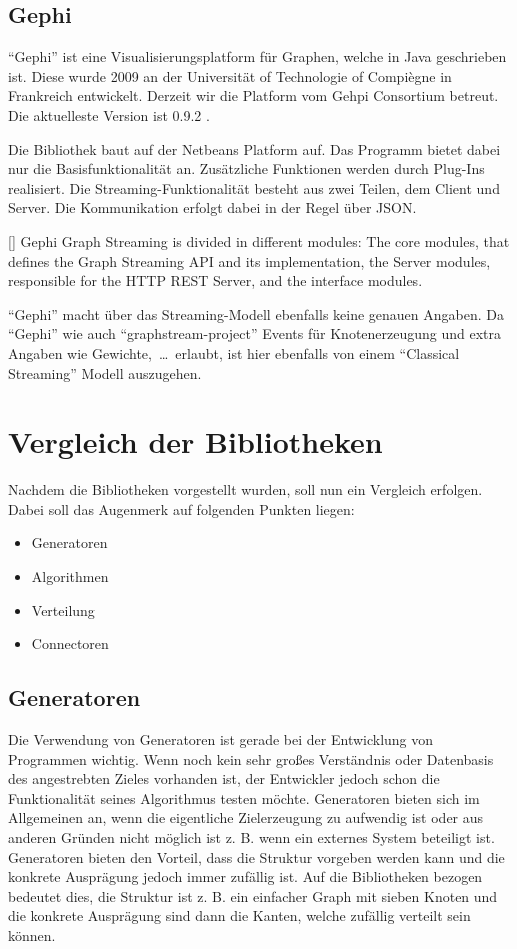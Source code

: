 \subsection{Gephi}
\enquote{Gephi} ist eine Visualisierungsplatform für Graphen, welche in Java
geschrieben ist. Diese wurde 2009 an der Universität of Technologie of Compiègne
in Frankreich entwickelt. Derzeit wir die Platform vom Gehpi Consortium betreut.
Die aktuelleste Version ist 0.9.2 .

Die Bibliothek baut auf der Netbeans Platform auf. Das Programm bietet dabei nur
die Basisfunktionalität an. Zusätzliche Funktionen werden durch Plug-Ins
realisiert. Die Streaming-Funktionalität besteht aus zwei Teilen, dem Client und
Server. Die Kommunikation erfolgt dabei in der Regel über \gls{JSON}.

[\cite{Bastian2009}]{
Gephi Graph Streaming is divided in different modules: The core modules, that
defines the Graph Streaming API and its implementation, the Server modules,
responsible for the HTTP REST Server, and the interface modules. 
}

\enquote{Gephi} macht über das Streaming-Modell ebenfalls keine genauen Angaben.
Da \enquote{Gephi} wie auch \enquote{graphstream-project} Events für
Knotenerzeugung und extra Angaben wie Gewichte,~\dots~erlaubt, ist hier
ebenfalls von einem \enquote{Classical Streaming} Modell auszugehen.

\section{Vergleich der Bibliotheken}
Nachdem die Bibliotheken vorgestellt wurden, soll nun ein Vergleich erfolgen.
Dabei soll das Augenmerk auf folgenden Punkten liegen:

\begin{itemize}
    \item Generatoren
    \item Algorithmen
    \item Verteilung
    \item Connectoren
\end{itemize}

\subsection{Generatoren}
Die Verwendung von Generatoren ist gerade bei der Entwicklung von Programmen
wichtig. Wenn noch kein sehr großes Verständnis oder Datenbasis des angestrebten
Zieles vorhanden ist, der Entwickler jedoch schon die Funktionalität seines
Algorithmus testen möchte. Generatoren bieten sich im Allgemeinen an, wenn die
eigentliche Zielerzeugung zu aufwendig ist oder aus anderen Gründen nicht möglich
ist z. B. wenn ein externes System beteiligt ist. Generatoren bieten den
Vorteil, dass die Struktur vorgeben werden kann und die konkrete Ausprägung jedoch
immer zufällig ist. Auf die Bibliotheken bezogen bedeutet dies, die Struktur ist
z. B. ein einfacher Graph mit sieben Knoten und die konkrete Ausprägung sind dann
die Kanten, welche zufällig verteilt sein können.

